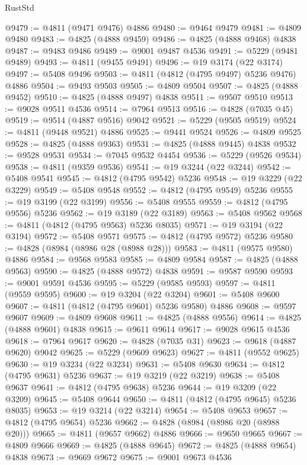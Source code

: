\begin{lexlean}{RustStd}
\begin{coremodule}
{\begin{coremodule}
{{{{{{{{{{{{{{{{{{{{{{{{{{{{{{{{{{{{{{{{{{{{{{{{{{{{{{{{{{{{{{{{{{{{{{{{{{{{{{{{@9479 := @4811 (@9471 @9476) @4886
@9480 := @9464 @9479
@9481 := @4809 @9480
@9483 := @4825 (@4888 @9459)
@9486 := @4825 (@4888 @9468) @4838
@9487 := @9483 @9486
@9489 := @9001 @9487 @4536
@9491 := @5229 (@9481 @9489)
@9493 := @4811 (@9455 @9491)
@9496 := @19 @3174 (@22 @3174)
@9497 := @5408 @9496
@9503 := @4811 (@4812 (@4795 @9497) @5236 @9476) @4886
@9504 := @9493 @9503
@9505 := @4809 @9504
@9507 := @4825 (@4888 @9452)
@9510 := @4825 (@4888 @9497) @4838
@9511 := @9507 @9510
@9513 := @9028 @9511 @4536
@9514 := @7964 @9513
@9516 := @4828 (@7035 @45)
@9519 := @9514 (@4887 @9516) @9042
@9521 := @5229 (@9505 @9519)
@9524 := @4811 (@9448 @9521) @4886
@9525 := @9441 @9524
@9526 := @4809 @9525
@9528 := @4825 (@4888 @9363)
@9531 := @4825 (@4888 @9445) @4838
@9532 := @9528 @9531
@9534 := @7045 @9532 @4454
@9536 := @5229 (@9526 @9534)
@9538 := @4811 (@9359 @9536)
@9541 := @19 @3244 (@22 @3244)
@9542 := @5408 @9541
@9545 := @4812 (@4795 @9542) @5236
@9548 := @19 @3229 (@22 @3229)
@9549 := @5408 @9548
@9552 := @4812 (@4795 @9549) @5236
@9555 := @19 @3199 (@22 @3199)
@9556 := @5408 @9555
@9559 := @4812 (@4795 @9556) @5236
@9562 := @19 @3189 (@22 @3189)
@9563 := @5408 @9562
@9568 := @4811 (@4812 (@4795 @9563) @5236 @8035)
@9571 := @19 @3194 (@22 @3194)
@9572 := @5408 @9571
@9575 := @4812 (@4795 @9572) @5236
@9580 := @4828 (@8984 (@8986 @28 (@8988 @28)))
@9583 := @4811 (@9575 @9580) @4886
@9584 := @9568 @9583
@9585 := @4809 @9584
@9587 := @4825 (@4888 @9563)
@9590 := @4825 (@4888 @9572) @4838
@9591 := @9587 @9590
@9593 := @9001 @9591 @4536
@9595 := @5229 (@9585 @9593)
@9597 := @4811 (@9559 @9595)
@9600 := @19 @3204 (@22 @3204)
@9601 := @5408 @9600
@9607 := @4811 (@4812 (@4795 @9601) @5236 @9580) @4886
@9608 := @9597 @9607
@9609 := @4809 @9608
@9611 := @4825 (@4888 @9556)
@9614 := @4825 (@4888 @9601) @4838
@9615 := @9611 @9614
@9617 := @9028 @9615 @4536
@9618 := @7964 @9617
@9620 := @4828 (@7035 @31)
@9623 := @9618 (@4887 @9620) @9042
@9625 := @5229 (@9609 @9623)
@9627 := @4811 (@9552 @9625)
@9630 := @19 @3234 (@22 @3234)
@9631 := @5408 @9630
@9634 := @4812 (@4795 @9631) @5236
@9637 := @19 @3219 (@22 @3219)
@9638 := @5408 @9637
@9641 := @4812 (@4795 @9638) @5236
@9644 := @19 @3209 (@22 @3209)
@9645 := @5408 @9644
@9650 := @4811 (@4812 (@4795 @9645) @5236 @8035)
@9653 := @19 @3214 (@22 @3214)
@9654 := @5408 @9653
@9657 := @4812 (@4795 @9654) @5236
@9662 := @4828 (@8984 (@8986 @20 (@8988 @20)))
@9665 := @4811 (@9657 @9662) @4886
@9666 := @9650 @9665
@9667 := @4809 @9666
@9669 := @4825 (@4888 @9645)
@9672 := @4825 (@4888 @9654) @4838
@9673 := @9669 @9672
@9675 := @9001 @9673 @4536
}}}}}}}}}}}}}}}}}}}}}}}}}}}}}}}}}}}}}}}}}}}}}}}}}}}}}}}}}}}}}}}}}}}}}}}}}}}}}}}}
\end{coremodule}}
\end{coremodule}
\end{lexlean}
